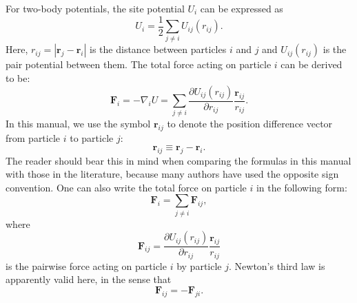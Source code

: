 \documentclass[12pt,a4paper]{report}
\newcommand{\vect}[1]{\boldsymbol{#1}}
\begin{document}
For two-body potentials, the site potential $U_i$ can be expressed as
\begin{equation}
\label{equation:U_i}
U_i= \frac{1}{2} \sum_{j \neq i} U_{ij}(r_{ij}).
\end{equation}
Here, $r_{ij} = |\vect{r}_j - \vect{r}_i|$ is the distance between particles $i$ and $j$ and $U_{ij}(r_{ij})$ is the pair potential between them.
The total force acting on particle $i$ can be derived to be:
\begin{equation}
\vect{F}_{i} = -\nabla_i U = \sum_{j \neq i}
\frac{\partial U_{ij}(r_{ij})}{\partial r_{ij}}
\frac{\vect{r}_{ij} }{r_{ij}}.
\end{equation}
In this manual, we use the symbol $\vect{r}_{ij}$ to denote the position difference vector from particle $i$ to particle $j$:
\begin{equation}
\boxed{\vect{r}_{ij} \equiv \vect{r}_j - \vect{r}_i}.
\end{equation}
The reader should bear this in mind when comparing the formulas in this manual with those in the literature, because many authors have used the opposite sign convention. One can also write the total force on particle $i$ in the following form:
\begin{equation}
\vect{F}_{i} = \sum_{j \neq i} \vect{F}_{ij},
\end{equation}
where
\begin{equation}
\vect{F}_{ij} =
\frac{\partial U_{ij}(r_{ij})}{\partial r_{ij}}
\frac{\vect{r}_{ij} }{r_{ij}}
\end{equation}
is the pairwise force acting on particle $i$ by particle $j$. Newton's third law is apparently valid here, in the sense that
\begin{equation}
\vect{F}_{ij} = - \vect{F}_{ji}.
\end{equation}
\end{document}
